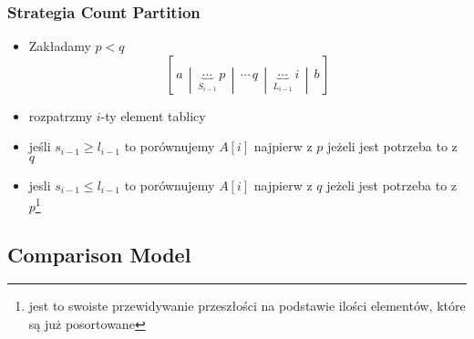 \documentclass[11pt,a4paper]{article}
\begin{document}
\subsubsection{Strategia Count Partition}
\begin{itemize}
    \item Zakładamy $p<q$
        \[
            \left[ \,
                a \,\middle|\,
                \underbrace{\cdots}_{S_{i-1}} \, p \,\middle|\,
                \cdots \, q \,\middle|\,
                \underbrace{\cdots}_{L_{i-1}} \, \boxed{i} \,\middle|\,
                b
            \,\right]
        \]
    \item rozpatrzmy $i$-ty element tablicy
    \item jeśli $s_{i-1} \geq l_{i-1}$ to porównujemy $A[i]$ najpierw z $p$ jeżeli jest potrzeba to z $q$
    \item jesli $s_{i-1} \leq l_{i-1}$ to porównujemy $A[i]$ najpierw z $q$ jeżeli jest potrzeba to z $p$\footnote{jest to swoiste przewidywanie przeszłości na podstawie ilości elementów, które są już posortowane}
\end{itemize}

\subsection{Comparison Model}
\end{document}
